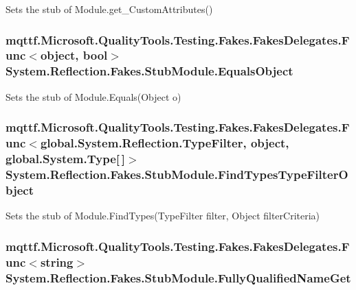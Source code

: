 Sets the stub of Module.\-get\-\_\-\-Custom\-Attributes()

\hypertarget{class_system_1_1_reflection_1_1_fakes_1_1_stub_module_a0fe2a1d5f91555179675504009597c13}{
\subsubsection[{Equals\-Object}]{\setlength{\rightskip}{0pt plus 5cm}mqttf.\-Microsoft.\-Quality\-Tools.\-Testing.\-Fakes.\-Fakes\-Delegates.\-Func$<$object, bool$>$ System.\-Reflection.\-Fakes.\-Stub\-Module.\-Equals\-Object}}\label{class_system_1_1_reflection_1_1_fakes_1_1_stub_module_a0fe2a1d5f91555179675504009597c13}


Sets the stub of Module.\-Equals(\-Object o)

\hypertarget{class_system_1_1_reflection_1_1_fakes_1_1_stub_module_aa056315545ab221ba51e819d9c3ac3e8}{
\subsubsection[{Find\-Types\-Type\-Filter\-Object}]{\setlength{\rightskip}{0pt plus 5cm}mqttf.\-Microsoft.\-Quality\-Tools.\-Testing.\-Fakes.\-Fakes\-Delegates.\-Func$<$global.\-System.\-Reflection.\-Type\-Filter, object, global.\-System.\-Type\mbox{[}$\,$\mbox{]}$>$ System.\-Reflection.\-Fakes.\-Stub\-Module.\-Find\-Types\-Type\-Filter\-Object}}\label{class_system_1_1_reflection_1_1_fakes_1_1_stub_module_aa056315545ab221ba51e819d9c3ac3e8}


Sets the stub of Module.\-Find\-Types(\-Type\-Filter filter, Object filter\-Criteria)

\hypertarget{class_system_1_1_reflection_1_1_fakes_1_1_stub_module_a3a7b123808a1756288c1fb7e37cc1369}{
\subsubsection[{Fully\-Qualified\-Name\-Get}]{\setlength{\rightskip}{0pt plus 5cm}mqttf.\-Microsoft.\-Quality\-Tools.\-Testing.\-Fakes.\-Fakes\-Delegates.\-Func$<$string$>$ System.\-Reflection.\-Fakes.\-Stub\-Module.\-Fully\-Qualified\-Name\-Get}}\label{class_system_1_1_reflection_1_1_fakes_1_1_stub_module_a3a7b123808a1756288c1fb7e37cc1369}


